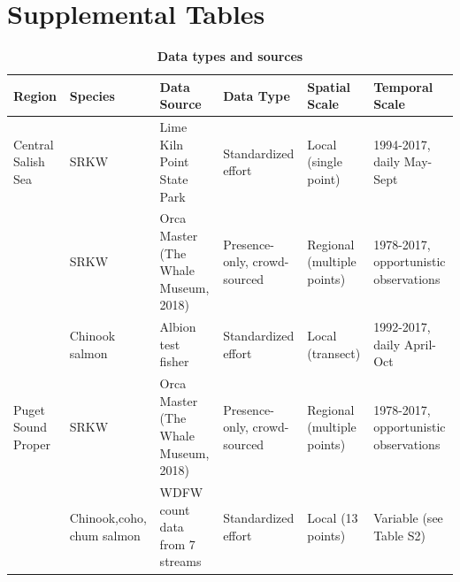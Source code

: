 \documentclass{article}
\begin{document}
\section* {Supplemental Tables}
\begin{table}[ht]
\centering
\caption{\textbf{Data types and sources}} 
\label{tab:salmon}
\begingroup\footnotesize
\begin{tabular}{|p{}|p{}|p{}|p{}|p{}|p{}|}
  \hline
Region & Species & Data Source & Data Type & Spatial Scale & Temporal Scale \\ 
  \hline
Central Salish Sea & SRKW & Lime Kiln Point State Park & Standardized effort & Local (single point) & 1994-2017, daily May-Sept \\ 
   & SRKW & Orca Master (The Whale Museum, 2018) & Presence-only, crowd-sourced & Regional (multiple points) & 1978-2017, opportunistic observations \\ 
   & Chinook salmon & Albion test fisher & Standardized effort & Local (transect) & 1992-2017, daily April-Oct \\ 
   \hline
Puget Sound Proper & SRKW & Orca Master (The Whale Museum, 2018) & Presence-only, crowd-sourced & Regional (multiple points) & 1978-2017, opportunistic observations \\ 
   & Chinook,coho, chum salmon & WDFW count data from 7 streams & Standardized effort & Local (13 points) & Variable (see Table S2) \\ 
   \hline
\end{tabular}
\endgroup
\end{table}
\end{document}
